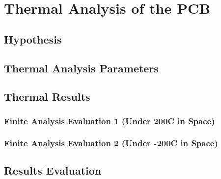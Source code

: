 \section{Thermal Analysis of the PCB}

\subsection{Hypothesis}

\subsection{Thermal Analysis Parameters}

\subsection{Thermal Results}

\subsubsection{Finite Analysis Evaluation 1 (Under 200C in Space)}

\subsubsection{Finite Analysis Evaluation 2 (Under -200C in Space)}

\subsection{Results Evaluation}
